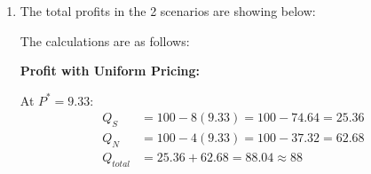 \documentclass[12pt]{article}
\begin{document}
\begin{enumerate}[label=(\alph*)]
\textbf{Students:}
\begin{align*}
P_S &= 12.5 - 0.125Q_S \\
R_S &= P_S \cdot Q_S = (12.5 - 0.125Q_S)Q_S = 12.5Q_S - 0.125Q_S^2 \\
MR_S &= \frac{d(R_S)}{dQ_S} = 12.5 - 0.25Q_S
\end{align*}

Setting $MR_S = MC$:
\begin{align*}
12.5 - 0.25Q_S &= 2 \\
0.25Q_S &= 10.5 \\
Q_S^* &= 42
\end{align*}

Therefore: $P_S^* = 12.5 - 0.125(42) = 12.5 - 5.25 = 7.25$

\textbf{Non-students:}
\begin{align*}
P_N &= 25 - 0.25Q_N \\
R_N &= P_N \cdot Q_N = (25 - 0.25Q_N)Q_N = 25Q_N - 0.25Q_N^2 \\
MR_N &= \frac{d(R_N)}{dQ_N} = 25 - 0.5Q_N
\end{align*}

Setting $MR_N = MC$:
\begin{align*}
25 - 0.5Q_N &= 2 \\
0.5Q_N &= 23 \\
Q_N^* &= 46
\end{align*}

Therefore: $P_N^* = 25 - 0.25(46) = 25 - 11.5 = 13.50$

\item The total profits in the 2 scenarios are showing below:


The calculations are as follows:

\textbf{Profit with Uniform Pricing:}

At $P^* = 9.33$:
\begin{align*}
Q_S &= 100 - 8(9.33) = 100 - 74.64 = 25.36 \\
Q_N &= 100 - 4(9.33) = 100 - 37.32 = 62.68 \\
Q_{total} &= 25.36 + 62.68 = 88.04 \approx 88
\end{align*}


\end{enumerate}
\end{document}
